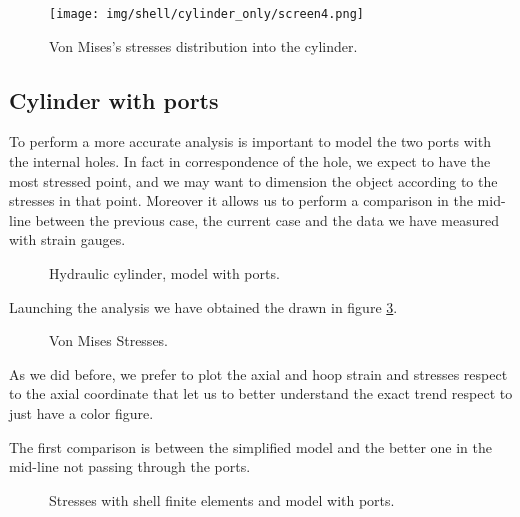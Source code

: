 \documentclass[a4paper,12pt]{article}
\begin{document}
\begin{figure}[H]
\centering
\texttt{[image: img/shell/cylinder\_only/screen4.png]}
\caption{Von Mises's stresses distribution into the cylinder.}
\label{fig:shell_cylinder_only_screen4}
\end{figure}





\subsection*{Cylinder with ports}

To perform a more accurate analysis is important to model the two ports with the internal holes. In fact in correspondence of the hole, we expect to have the most stressed point, and we may want to dimension the object according to the stresses in that point. 
Moreover it allows us to perform a comparison in the mid-line between the previous case, the current case and the data we have measured with strain gauges.
\begin{figure}[H]
\centering     %
\caption{Hydraulic cylinder, model with ports.}
\label{fig:shell_cylinder_ports_screen1_2}
\end{figure}
Launching the analysis we have obtained the drawn in figure \ref{fig:shell_cylinder_ports_screen3_4}.
\begin{figure}[H]
\centering     %
\caption{Von Mises Stresses.}
\label{fig:shell_cylinder_ports_screen3_4}
\end{figure}
As we did before, we prefer to plot the axial and hoop strain and stresses respect to the axial coordinate that let us to better understand the exact trend respect to just have a color figure. 

The first comparison is between the simplified model and the better one in the mid-line not passing through the ports.

\begin{figure}[h]
\centering     %
\caption{Stresses with shell finite elements and model with ports.}
\label{fig:shellmodel2stress}
\end{figure}
\end{document}
